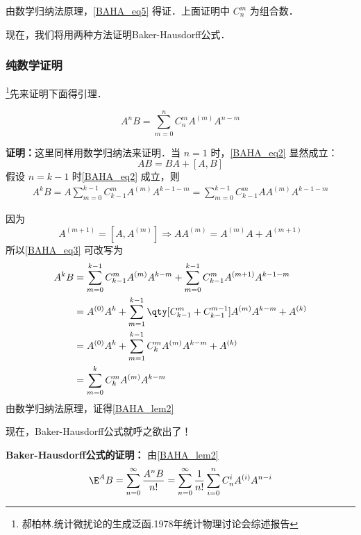 由数学归纳法原理，\autoref{BAHA_eq5} 得证．上面证明中 $C_n^m$ 为组合数．

现在，我们将用两种方法证明Baker-Hausdorff公式．
\subsubsection{纯数学证明}
\footnote{郝柏林.统计微扰论的生成泛函.1978年统计物理讨论会综述报告}先来证明下面得引理．
\begin{lemma}{}\label{BAHA_lem2}
\begin{equation}\label{BAHA_eq2}
A^nB=\sum_{m=0}^{n}C_{n}^mA^{(m)}A^{n-m}
\end{equation}
\end{lemma}
\textbf{证明：}这里同样用数学归纳法来证明．当 $n=1$ 时，\autoref{BAHA_eq2} 显然成立：
\begin{equation}
AB=BA+[A,B]
\end{equation}
假设 $n=k-1$ 时\autoref{BAHA_eq2} 成立，则
\begin{equation}\label{BAHA_eq3}
\begin{aligned}
A^{k}B=A\sum_{m=0}^{k-1}C_{k-1}^mA^{(m)}A^{k-1-m}=\sum_{m=0}^{k-1}C_{k-1}^mAA^{(m)}A^{k-1-m}
\end{aligned}
\end{equation}

因为
\begin{equation}
A^{(m+1)}=[A,A^{(m)}]\Rightarrow AA^{(m)}=A^{(m)}A+A^{(m+1)}
\end{equation}
所以\autoref{BAHA_eq3} 可改写为
\begin{equation}
\begin{aligned}
A^k B&=\sum_{m=0}^{k-1}C_{k-1}^mA^{(m)}A^{k-m}+\sum_{m=0}^{k-1}C_{k-1}^mA^{(m+1)}A^{k-1-m}\\
&=A^{(0)}A^{k}+\sum_{m=1}^{k-1}\qty[C_{k-1}^m+C_{k-1}^{m-1}]A^{(m)}A^{k-m}+A^{(k)}\\
&=A^{(0)}A^{k}+\sum_{m=1}^{k-1}C_{k}^mA^{(m)}A^{k-m}+A^{(k)}\\
&=\sum_{m=0}^{k}C_{k}^mA^{(m)}A^{k-m}
\end{aligned}
\end{equation}
由数学归纳法原理，证得\autoref{BAHA_lem2} 

现在，Baker-Hausdorff公式就呼之欲出了！

\textbf{Baker-Hausdorff公式的证明：}
由\autoref{BAHA_lem2} 
\begin{equation}\label{BAHA_eq4}
\E^A B=\sum_{n=0}^{\infty}\frac{A^nB}{n!}=\sum_{n=0}^{\infty}\frac{1}{n!}\sum_{i=0}^{n}C_{n}^iA^{(i)}A^{n-i}
\end{equation}

